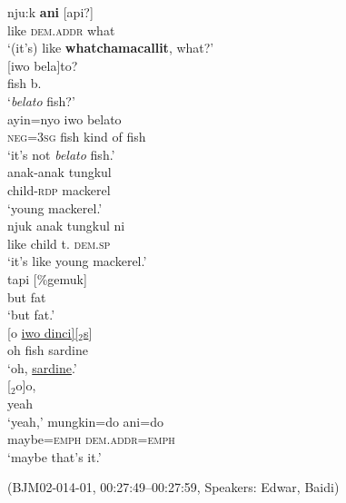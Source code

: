 \documentclass[output=paper,colorlinks,citecolor=brown
\ChapterDOI{10.5281/zenodo.15697585}
]{langscibook}
\begin{document}
\begin{exe}
    \ex\label{ex:place-repair-cooperative} \begin{xlist}[0\quad →A:]
         \gll
        nju:k \textbf{ani} [api?] \\
        like \textsc{dem.addr} what \\
        \glt `(it's) like \textbf{whatchamacallit}, what?' \\
         \gll
        \hspace{6.3em}[iwo bela]to? \\
        \hspace{6.3em}\hphantom{[}fish b. \\
        \glt \hspace{6.3em}`\textit{belato} fish?' \\
         \gll
        ayin=nyo iwo belato \\
        \textsc{neg}=3\textsc{sg} fish {kind of fish} \\
        \glt `it's not \textit{belato} fish.' \\
        \exi{4\quad \hphantom{→E:}} \gll
        anak-anak tungkul \\
        child-\textsc{rdp} mackerel \\
        \glt `young mackerel.' \\
        \exi{5\quad \hphantom{→E:}} \gll
        njuk anak tungkul ni \\
        like child t. \textsc{dem.sp} \\
        \glt `it's like young mackerel.' \\
        \exi{6\quad \hphantom{→E:}} \gll
        tapi [\%gemuk] \\
        but \hphantom{[\%}fat\\
        \glt `but fat.' \\
         \gll
        \hspace{1.7em}[o \uline{iwo dinci][$_2$s}] \\
        \hspace{1.7em}oh {fish sardine} \\
        \glt \hspace{1.7em}`oh, \uline{sardine}.' \\
         \gll
        \hspace{6.2em}[$_2$o]o, \\
        \hspace{6.2em}yeah \\
        \glt \hspace{6.2em}`yeah,'
        \exi{9\quad \hphantom{→E:}} \gll
        mungkin=do ani=do \\
        maybe=\textsc{emph} \textsc{dem.addr}=\textsc{emph} \\
        \glt `maybe that's it.' \\
    \end{xlist}
    \hfill (BJM02-014-01, 00:27:49–00:27:59, Speakers: Edwar, Baidi) 
\end{exe}
\end{document}
